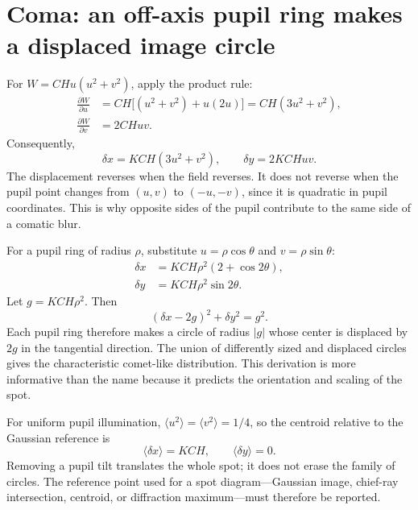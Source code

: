 \section{Coma: an off-axis pupil ring makes a displaced image circle}
For $W=CHu(u^2+v^2)$, apply the product rule:
\begin{align}
 \frac{\partial W}{\partial u}
 &=CH\bigl[(u^2+v^2)+u(2u)\bigr]=CH(3u^2+v^2),\\
 \frac{\partial W}{\partial v}&=2CHuv.
\end{align}
Consequently,
\begin{equation}
 \delta x=KCH(3u^2+v^2),\qquad
 \delta y=2KCHuv.
 \label{ab:comarays}
\end{equation}
The displacement reverses when the field reverses. It does not reverse when
the pupil point changes from $(u,v)$ to $(-u,-v)$, since it is quadratic in
pupil coordinates. This is why opposite sides of the pupil contribute to
the same side of a comatic blur.

For a pupil ring of radius $\rho$, substitute $u=\rho\cos\theta$ and
$v=\rho\sin\theta$:
\begin{align}
 \delta x&=KCH\rho^2(2+\cos2\theta),\\
 \delta y&=KCH\rho^2\sin2\theta.
\end{align}
Let $g=KCH\rho^2$. Then
\begin{equation}
 (\delta x-2g)^2+\delta y^2=g^2.
\end{equation}
Each pupil ring therefore makes a circle of radius $|g|$ whose center is
displaced by $2g$ in the tangential direction. The union of differently sized
and displaced circles gives the characteristic comet-like distribution.
This derivation is more informative than the name because it predicts the
orientation and scaling of the spot.

For uniform pupil illumination, $\langle u^2\rangle=\langle v^2\rangle=1/4$,
so the centroid relative to the Gaussian reference is
\begin{equation}
 \langle\delta x\rangle=KCH,\qquad
 \langle\delta y\rangle=0.
\end{equation}
Removing a pupil tilt translates the whole spot; it does not erase the family
of circles. The reference point used for a spot diagram---Gaussian image,
chief-ray intersection, centroid, or diffraction maximum---must therefore be
reported.

